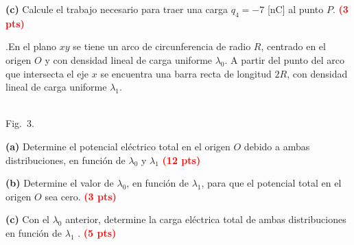 \documentclass[addpoints,12pt]{exam}
\newcommand{\qpts}[1]{{\setlength{\fboxsep}{2.5pt}\fbox{#1}}\hspace{0.6em}\ignorespaces}
\newcommand{\qhead}[1]{\thequestion.\hspace{0.5em}\qpts{#1}}
\newcommand{\pts}[1]{\textcolor{red}{\textbf{(#1 pts)}}}
\begin{document}
\begin{questions}
\vspace{6.5cm}
\noindent\textbf{(c)} Calcule el trabajo necesario para traer una carga $q_4=-7$ [nC] al punto $P$. \pts{3}

\newpage

\question[20]
\begin{minipage}[t]{0.56\textwidth}
\vspace{0pt}
\qhead{20}En el plano $xy$ se tiene un arco de circunferencia de radio $R$, centrado en el origen $O$ y
con densidad lineal de carga uniforme $\lambda_0$. A partir del punto del arco que intersecta el eje $x$
se encuentra una barra recta de longitud $2R$, con densidad lineal de carga uniforme $\lambda_1$.
\end{minipage}\hfill
\begin{minipage}[t]{0.40\textwidth}
\vspace{0pt}
\centering
{}\\[2pt]
{\footnotesize Fig.\ 3.}
\end{minipage}

\medskip
\noindent\textbf{(a)} Determine el potencial el\'ectrico total en el origen $O$ debido a ambas distribuciones, en función de $\lambda_0$ y $\lambda_1$ \pts{12}

\vspace{7.5cm}
\noindent\textbf{(b)} Determine el valor de $\lambda_0$, en funci\'on de $\lambda_1$, para que el potencial total en el origen $O$ sea cero. \pts{3}

\vspace{3cm}
\noindent\textbf{(c)} Con el $\lambda_0$ anterior, determine la carga el\'ectrica total de ambas distribuciones en funci\'on de $\lambda_1$ . \pts{5}

\end{questions}
\end{document}
